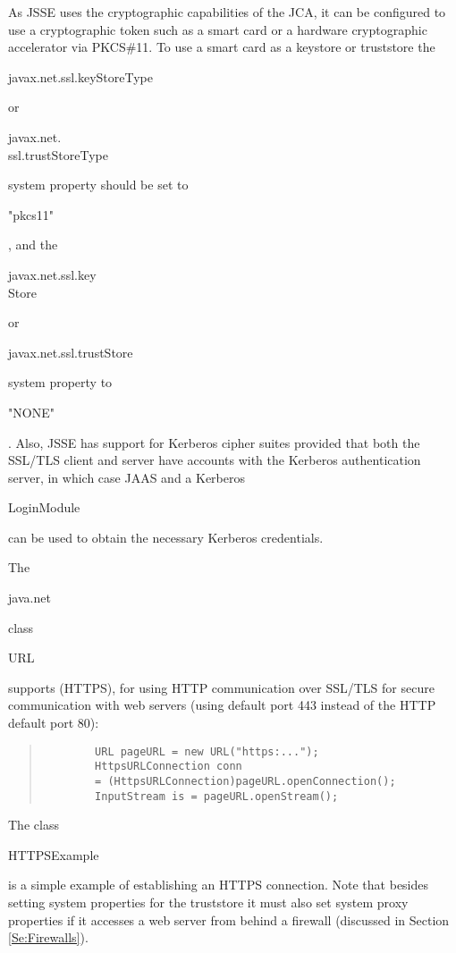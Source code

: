 As JSSE uses the cryptographic capabilities of the JCA, it can be configured
to use a cryptographic token such as a smart card or a hardware cryptographic accelerator
via PKCS\#11.
To use a smart card as a keystore or truststore the
\begin{code}javax.net.ssl.keyStoreType\end{code} or
\begin{code}javax.net.\\ssl.trustStoreType\end{code} system property
should be set to \begin{code}"pkcs11"\end{code}, and the
\begin{code}javax.net.ssl.key\\Store\end{code} or
\begin{code}javax.net.ssl.trustStore\end{code} system property to
\begin{code}"NONE"\end{code}.
Also, JSSE has support for Kerberos cipher suites provided that both the
SSL/TLS client and server have accounts with the Kerberos authentication server,
in which case JAAS and a Kerberos \begin{code}LoginModule\end{code} can be used
to obtain the necessary Kerberos credentials.

The \begin{code}java.net\end{code} class \begin{code}URL\end{code} supports
 (HTTPS), for using HTTP communication over
SSL/TLS for secure communication with web servers (using default port 443 instead
of the HTTP default port 80):
\begin{quote}\begin{code}\begin{verbatim}
		URL pageURL = new URL("https:...");
		HttpsURLConnection conn
		= (HttpsURLConnection)pageURL.openConnection();
		InputStream is = pageURL.openStream();
		\end{verbatim}\end{code}\end{quote}
The class \begin{code}HTTPSExample\end{code} is a simple example of
establishing an HTTPS connection.
Note that besides setting system properties for the truststore
it must also set system proxy properties if it accesses a web server from behind a firewall
(discussed in Section \ref{Se:Firewalls}).

